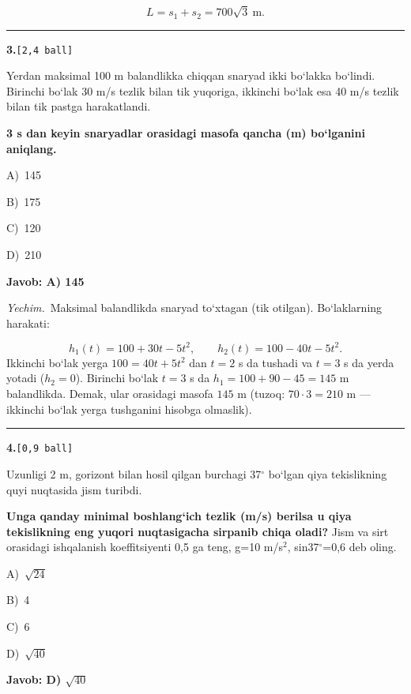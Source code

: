 \documentclass[11pt,a4paper]{article}
\newcommand{\ball}[1]{\hfill\texttt{[#1 ball]}}
\newcommand{\qhead}[2]{\Needspace{10\baselineskip}\noindent\textbf{#1.}\ball{#2}\par\nopagebreak}
\newcommand{\opt}[2]{\hspace*{8mm}#1)\ #2\par}
\newenvironment{qbody}{\begin{list}{}{\leftmargin=8mm\rightmargin=0pt\topsep=0pt\itemsep=0pt\parsep=3pt}\item\relax}{\end{list}}
\begin{document}
\[L=s_1+s_2=700\sqrt3\ \text{m}.\]\par\medskip\hrule\medskip
\noindent\begin{minipage}{\linewidth}
\qhead{3}{2,4}
\begin{qbody}
Yerdan maksimal 100 m balandlikka chiqqan snaryad ikki bo‘lakka bo‘lindi. Birinchi bo‘lak 30 m/s tezlik bilan tik yuqoriga, ikkinchi bo‘lak esa 40 m/s tezlik bilan tik pastga harakatlandi.\par
\textbf{3 s dan keyin snaryadlar orasidagi masofa qancha (m) bo‘lganini aniqlang.}\par
\smallskip
\opt{A}{145}
\opt{B}{175}
\opt{C}{120}
\opt{D}{210}
\end{qbody}\end{minipage}\par\vspace{2pt}
\noindent\colorbox{gray!12}{\parbox{\dimexpr\linewidth-2\fboxsep}{\textbf{Javob: A) 145}}}\par\smallskip
\noindent\textit{Yechim.}\ Maksimal balandlikda snaryad to‘xtagan (tik otilgan). Bo‘laklarning harakati:\par
\[h_1(t)=100+30t-5t^2,\qquad h_2(t)=100-40t-5t^2.\]
Ikkinchi bo‘lak yerga $100=40t+5t^2$ dan $t=2$ s da tushadi va $t=3$ s da yerda yotadi ($h_2=0$). Birinchi bo‘lak $t=3$ s da $h_1=100+90-45=145$ m balandlikda. Demak, ular orasidagi masofa $145$ m (tuzoq: $70\cdot3=210$ m — ikkinchi bo‘lak yerga tushganini hisobga olmaslik).\par\par\medskip\hrule\medskip
\noindent\begin{minipage}{\linewidth}
\qhead{4}{0,9}
\begin{qbody}
Uzunligi 2 m, gorizont bilan hosil qilgan burchagi 37$^\circ$ bo‘lgan qiya tekislikning quyi nuqtasida jism turibdi.\par
\textbf{Unga qanday minimal boshlang‘ich tezlik (m/s) berilsa u qiya tekislikning eng yuqori nuqtasigacha sirpanib chiqa oladi?} Jism va sirt orasidagi ishqalanish koeffitsiyenti 0,5 ga teng, g=10 m/s$^{2}$, sin37$^\circ$=0,6 deb oling.\par
\smallskip
\opt{A}{$\sqrt{24}$}
\opt{B}{4}
\opt{C}{6}
\opt{D}{$\sqrt{40}$}
\end{qbody}\end{minipage}\par\vspace{2pt}
\noindent\colorbox{gray!12}{\parbox{\dimexpr\linewidth-2\fboxsep}{\textbf{Javob: D) $\sqrt{40}$}}}\par\smallskip
\end{document}
